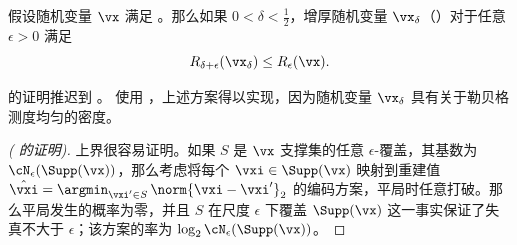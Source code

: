 \documentclass[../../book-main_zh.tex]{subfiles}
\begin{document}
\begin{lemma}\label{lem:rate-distortion-lb-uos}
    假设随机变量 $\vx$ 满足 。那么如果 $0 < \delta < \tfrac{1}{2}$，增厚随机变量 $\vx_{\delta}$（）对于任意 $\epsilon > 0$ 满足
    \begin{equation}
        R_{\delta + \epsilon}(\vx_{\delta})
        \leq
        R_{\epsilon}(\vx).
    \end{equation}
\end{lemma}

 的证明推迟到 。
使用 ，上述方案得以实现，因为随机变量 $\vx_{\delta}$ 具有关于勒贝格测度均匀的密度。

\begin{proof}[( 的证明)]
    上界很容易证明。如果 $S$ 是 $\vx$ 支撑集的任意 $\epsilon$-覆盖，其基数为 $\cN_{\epsilon}(\Supp(\vx))$，那么考虑将每个 $\vxi \in \Supp(\vx)$ 映射到重建值 $\hat{\vxi} = \argmin_{\vxi' \in S}\, \norm{\vxi - \vxi'}_2$ 的编码方案，平局时任意打破。那么平局发生的概率为零，并且 $S$ 在尺度 $\epsilon$ 下覆盖 $\Supp(\vx)$ 这一事实保证了失真不大于 $\epsilon$；该方案的率为 $\log_2 \cN_{\epsilon}(\Supp(\vx))$。


\end{proof}
\end{document}
